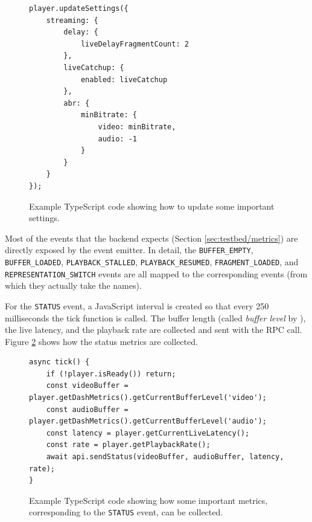 \begin{figure}[h]
    \centering
    \begin{verbatim}
player.updateSettings({
    streaming: {
        delay: {
            liveDelayFragmentCount: 2
        },
        liveCatchup: {
            enabled: liveCatchup
        },
        abr: {
            minBitrate: {
                video: minBitrate,
                audio: -1
            }
        }
    }
});
    \end{verbatim}
    \caption{Example TypeScript code showing how to update some important \dashjs{} settings.}
    \label{fig:dashjs_settings}
\end{figure}

Most of the events that the backend expects (Section \ref{sec:testbed/metrics}) are directly exposed by the \dashjs{} event emitter. In detail, the \texttt{BUFFER\_EMPTY}, \texttt{BUFFER\_LOADED}, \texttt{PLAYBACK\_STALLED}, \texttt{PLAYBACK\_RESUMED}, \texttt{FRAGMENT\_LOADED}, and \texttt{REPRESENTATION\_SWITCH} events are all mapped to the corresponding \dashjs{} events (from which they actually take the names).

For the \texttt{STATUS} event, a JavaScript interval is created so that every 250 milliseconds the tick function is called. The buffer length (called \textit{buffer level} by \dashjs{}), the live latency, and the playback rate are collected and sent with the RPC call. Figure \ref{fig:dashjs_tick} shows how the status metrics are collected.

\begin{figure}[h]
    \centering
    \begin{verbatim}
async tick() {
    if (!player.isReady()) return;
    const videoBuffer = player.getDashMetrics().getCurrentBufferLevel('video');
    const audioBuffer = player.getDashMetrics().getCurrentBufferLevel('audio');
    const latency = player.getCurrentLiveLatency();
    const rate = player.getPlaybackRate();
    await api.sendStatus(videoBuffer, audioBuffer, latency, rate);
}
    \end{verbatim}
    \caption{Example TypeScript code showing how some important \dashjs{} metrics, corresponding to the \texttt{STATUS} event, can be collected.}
    \label{fig:dashjs_tick}
\end{figure}

\subsection{\hlsjs{}}
\label{sec:testbed/frontend/hlsjs}


